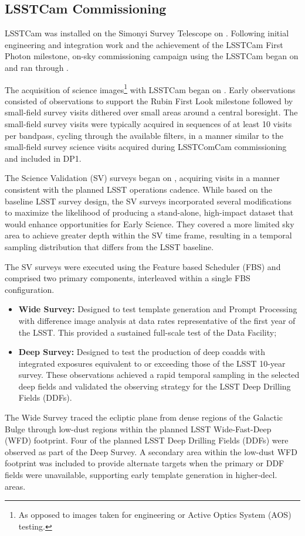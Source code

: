 \subsection{LSSTCam Commissioning}
\label{ssec:commissioning-lsstcam}

LSSTCam was installed on the Simonyi Survey Telescope on \cameraontma.
Following initial engineering and integration work and the achievement of the LSSTCam First Photon milestone, on-sky commissioning campaign using the LSSTCam began on \startonskylsstcam and ran through \finonskylsstcam.

The acquisition of science images\footnote{As opposed to images taken for engineering or Active Optics System (AOS) testing.} with LSSTCam began on \startsciencelsstcam.
Early observations consisted of  observations to support the Rubin First Look milestone followed by small-field survey visits dithered over small areas around a central boresight.
The small-field survey visits were typically acquired in sequences of at least 10 visits per bandpass, cycling through the available filters, in a manner similar to the small-field survey science visits acquired during LSSTComCam commissioning and  included in DP1.

The Science Validation (SV) surveys began on \startsv, acquiring visits in a manner consistent with the planned LSST operations cadence.
While based on the baseline LSST survey design, the SV surveys incorporated several modifications to maximize the likelihood of producing a stand-alone, high-impact dataset that would enhance opportunities for Early Science.
They covered a more limited sky area to achieve greater depth within the SV time frame, resulting in a temporal sampling distribution that differs from the LSST baseline.

The SV surveys were executed using the Feature based Scheduler (FBS) and comprised two primary components, interleaved within a single FBS configuration.
\begin{itemize}
\item \textbf{Wide Survey:}  Designed to test template generation and Prompt Processing with difference image analysis at data rates representative of the first year of the LSST.
This provided a sustained full-scale test of the Data Facility;
\item \textbf{Deep Survey:} Designed to test the production of deep coadds with integrated exposures  equivalent to or exceeding those of the LSST 10-year survey.
These observations achieved a rapid temporal sampling in the selected deep fields and validated the observing strategy for the LSST Deep Drilling Fields (DDFs).
\end{itemize}
The Wide Survey traced the ecliptic plane from dense regions of the Galactic Bulge through low-dust regions within the planned LSST Wide-Fast-Deep (WFD) footprint.
Four of the planned LSST Deep Drilling Fields (DDFs) were observed as part of the Deep Survey.
A secondary area within the low-dust WFD footprint was included to provide alternate targets when the primary or DDF fields were  unavailable, supporting early template generation in higher-decl. areas.

